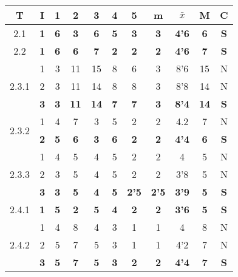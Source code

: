 \documentclass[11pt,a4paper,spanish,twoside]{report}
\begin{document}
\begin{table}[!h]
\centering
  \begin{tabular}{|c|c||c|c|c|c|c||c|c|c||c|}
    \hline
    \textbf{T} & \textbf{I} & \textbf{1} &
    \textbf{2} & \textbf{3} & \textbf{4} & \textbf{5} & \textbf{m}
    &\textbf{$\bar{x}$} &\textbf{M} & \textbf{C}\\
    \hline \hline

    2.1 & \textbf{1} & \textbf{6} & \textbf{3} & \textbf{6} &
    \textbf{5} & \textbf{3} & \textbf{3} & \textbf{4'6} & \textbf{6} &
    \textbf{S}\\
    \hline

    2.2 & \textbf{1} & \textbf{6} & \textbf{6} & \textbf{7} &
    \textbf{2} & \textbf{2} & \textbf{2} & \textbf{4'6} & \textbf{7} &
    \textbf{S}\\ 
    \hline

    \multirow{3}{*}{2.3.1}
    & 1 & 3 & 11 & 15 & 8 & 6 & 3 & 8'6 & 15 & N \\
    & 2 & 3 & 11 & 14 & 8 & 8 & 3 & 8'8 & 14 & N \\
    & \textbf{3} & \textbf{3} & \textbf{11} & \textbf{14} & \textbf{7} &
    \textbf{7} & \textbf{3} & \textbf{8'4} & \textbf{14} & \textbf{S} \\
    \hline

    \multirow{2}{*}{2.3.2} & 1 & 4 & 7 & 3 & 5 & 2 & 2 & 4.2 & 7 & N \\
    & \textbf{2} & \textbf{5} & \textbf{6} & \textbf{3} & \textbf{6} &
    \textbf{2} & \textbf{2} & \textbf{4'4} & \textbf{6} & \textbf{S} \\
    \hline

    \multirow{3}{*}{2.3.3}
    & 1 & 4 & 5 & 4 & 5 & 2 & 2 & 4   & 5 & N \\
    & 2 & 3 & 5 & 4 & 5 & 2 & 2 & 3'8 & 5 & N \\
    & \textbf{3} & \textbf{3} & \textbf{5} & \textbf{4} & \textbf{5} &
    \textbf{2'5} & \textbf{2'5} & \textbf{3'9} & \textbf{5} & \textbf{S} \\
    \hline

    2.4.1 & \textbf{1} & \textbf{5} & \textbf{2} & \textbf{5} &
    \textbf{4} & \textbf{2} & \textbf{2} & \textbf{3'6} & \textbf{5} &
    \textbf{S} \\ 
    \hline

    \multirow{3}{*}{2.4.2}
    & 1 & 4 & 8 & 4 & 3 & 1 & 1 & 4   & 8 & N \\
    & 2 & 5 & 7 & 5 & 3 & 1 & 1 & 4'2 & 7 & N \\
    & \textbf{3} & \textbf{5} & \textbf{7} & \textbf{5} & \textbf{3} &
    \textbf{2} & \textbf{2} & \textbf{4'4} & \textbf{7} & \textbf{S} \\ 
    \hline


\end{tabular}
\end{table}
\end{document}
